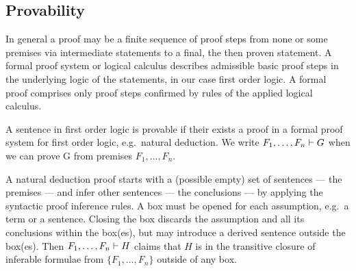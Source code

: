 
\subsection{Provability}

In general a proof may be a finite sequence of proof steps
from none or some premises via intermediate statements
to a final, the then proven statement.
A formal proof system or logical calculus describes admissible basic proof steps
in the underlying logic of the statements, in our case first order logic.
A formal proof comprises only proof steps confirmed by rules of the applied logical calculus.



\begin{definition}A sentence in first order logic is provable
	if their exists a proof in a formal proof system for first order logic,
	e.g.~natural deduction.
	We write
	\( F_1, \ldots, F_n \vdash G \)
	when we can prove G from premises \( F_1,\ldots,F_n \).
\end{definition}

A natural deduction proof starts with a (possible empty) set of sentences --- the premises ---
and infer other sentences --- the conclusions --- by applying the syntactic proof inference rules.
A box must be opened for each assumption, e.g.~a term or a sentence.
Closing the box discards the assumption and all its conclusions within the box{(es)},
but may introduce a derived sentence outside the box{(es)}.
Then \( F_1,\ldots,F_n \vdash H \) claims that \( H \)
is in the transitive closure of inferable formulae from \( \{ F_1,\ldots,F_n\} \) outside of any box.

